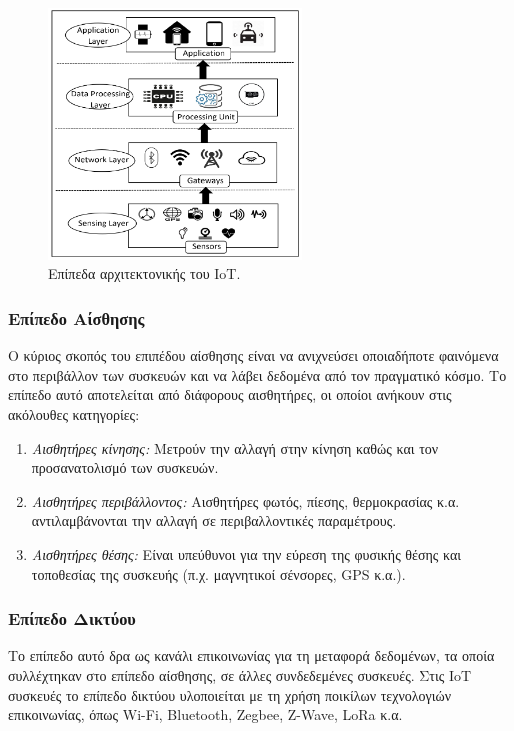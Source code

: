 \begin{figure}[!ht]
	\centering
	\includegraphics[width=0.6\textwidth]{./images/chapter2/iot_layers.png}
	\caption{Επίπεδα αρχιτεκτονικής του IoT.}
	\label{fig:iot_layers}
\end{figure}

\subsubsection{Επίπεδο Αίσθησης}
\label{subsubsec:sensing}

Ο κύριος σκοπός του επιπέδου αίσθησης είναι να ανιχνεύσει οποιαδήποτε φαινόμενα στο περιβάλλον των συσκευών και να λάβει δεδομένα από τον πραγματικό κόσμο. Το επίπεδο αυτό αποτελείται από διάφορους αισθητήρες, οι οποίοι ανήκουν στις ακόλουθες κατηγορίες:

\begin{enumerate}
	\item \textit{Αισθητήρες κίνησης:} Μετρούν την αλλαγή στην κίνηση καθώς και τον προσανατολισμό των συσκευών.
	\item \textit{Αισθητήρες περιβάλλοντος:} Αισθητήρες φωτός, πίεσης, θερμοκρασίας κ.α. αντιλαμβάνονται την αλλαγή σε περιβαλλοντικές παραμέτρους. 
	\item \textit{Αισθητήρες θέσης:} Είναι υπεύθυνοι για την εύρεση της φυσικής θέσης και τοποθεσίας της συσκευής (π.χ. μαγνητικοί σένσορες, GPS κ.α.).
\end{enumerate}

\subsubsection{Επίπεδο Δικτύου}
\label{subsubsec:network}

Το επίπεδο αυτό δρα ως κανάλι επικοινωνίας για τη μεταφορά δεδομένων, τα οποία συλλέχτηκαν στο επίπεδο αίσθησης, σε άλλες συνδεδεμένες συσκευές. Στις IoT συσκευές το επίπεδο δικτύου υλοποιείται με τη χρήση ποικίλων τεχνολογιών επικοινωνίας, όπως Wi-Fi, Bluetooth, Zegbee, Z-Wave, LoRa κ.α.

